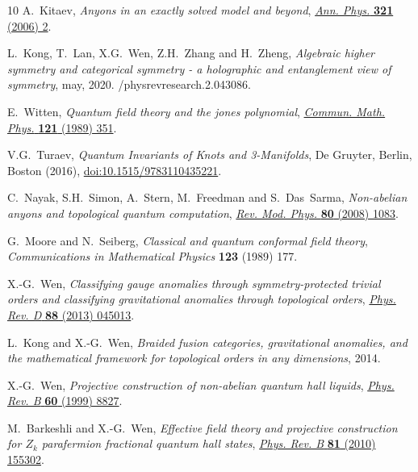 \documentclass[11pt,nofootinbib,preprint]{revtex4-1}
\begin{document}
\begin{thebibliography}{10}
A.~Kitaev, \emph{Anyons in an exactly solved model and beyond},
  \href{https://doi.org/10.1016/j.aop.2005.10.005}{\emph{Ann. Phys.} {\bfseries
  321} (2006) 2}.

L.~Kong, T.~Lan, X.G.~Wen, Z.H.~Zhang and H.~Zheng, \emph{{Algebraic higher
  symmetry and categorical symmetry - a holographic and entanglement view of
  symmetry}},  may, 2020.
/physrevresearch.2.043086.

E.~Witten, \emph{Quantum field theory and the jones polynomial},
  \href{https://doi.org/10.1007/BF01217730}{\emph{Commun. Math. Phys.}
  {\bfseries 121} (1989) 351}.

V.G.~Turaev, \emph{Quantum Invariants of Knots and 3-Manifolds}, De Gruyter,
  Berlin, Boston (2016),
  \href{https://doi.org/doi:10.1515/9783110435221}{doi:10.1515/9783110435221}.

C.~Nayak, S.H.~Simon, A.~Stern, M.~Freedman and S.~Das~Sarma, \emph{Non-abelian
  anyons and topological quantum computation},
  \href{https://doi.org/10.1103/RevModPhys.80.1083}{\emph{Rev. Mod. Phys.}
  {\bfseries 80} (2008) 1083}.

G.~Moore and N.~Seiberg, \emph{Classical and quantum conformal field theory},
  {\emph{Communications in Mathematical Physics} {\bfseries 123} (1989) 177}.

X.-G.~Wen, \emph{Classifying gauge anomalies through symmetry-protected trivial
  orders and classifying gravitational anomalies through topological orders},
  \href{https://doi.org/10.1103/PhysRevD.88.045013}{\emph{Phys. Rev. D}
  {\bfseries 88} (2013) 045013}.

L.~Kong and X.-G.~Wen, \emph{Braided fusion categories, gravitational
  anomalies, and the mathematical framework for topological orders in any
  dimensions},  2014.

X.-G.~Wen, \emph{Projective construction of non-abelian quantum hall liquids},
  \href{https://doi.org/10.1103/PhysRevB.60.8827}{\emph{Phys. Rev. B}
  {\bfseries 60} (1999) 8827}.

M.~Barkeshli and X.-G.~Wen, \emph{Effective field theory and projective
  construction for ${Z}_{k}$ parafermion fractional quantum hall states},
  \href{https://doi.org/10.1103/PhysRevB.81.155302}{\emph{Phys. Rev. B}
  {\bfseries 81} (2010) 155302}.


\end{thebibliography}
\end{document}
